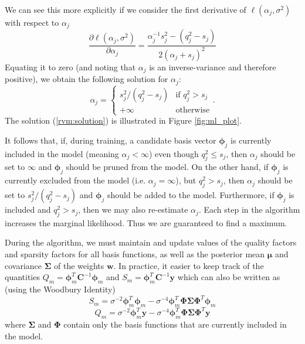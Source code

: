 We can see this more explicitly if we consider the first derivative of $\ell(\alpha_j,\sigma^2)$ with respect to $\alpha_j$ \cite{tipping2002}
\begin{equation*}
  \frac{\partial\ell(\alpha_j,\sigma^2)}{\partial\alpha_j} = \frac{\alpha_j^{-1}s_j^2 - (q_j^2 - s_j)}{2(\alpha_j+s_j)^2}
\end{equation*}
Equating it to zero (and noting that $\alpha_j$ is an inverse-variance and therefore positive), we obtain the following solution for $\alpha_j$:
\begin{equation}
  \label{rvm:solution}
  \alpha_j = \left\{\begin{array}{lr}
      s_j^2 / (q_j^2 - s_j) & \mbox{if $q_j^2 > s_j$}\\
      +\infty & \mbox{otherwise}
    \end{array}\right..
\end{equation}
The solution (\ref{rvm:solution}) is illustrated in Figure \ref{fig:ml_plot}.

It follows that, if, during training, a candidate basis vector $\bm\phi_j$ is currently included in the model (meaning $\alpha_j < \infty$) even though $q_j^2 \leq s_j$, then $\alpha_j$ should be set to $\infty$ and $\bm\phi_j$ should be pruned from the model.
On the other hand, if $\bm\phi_j$ is currently excluded from the model (i.e. $\alpha_j=\infty$), but $q_j^2 > s_j$, then $\alpha_j$ should be set to $s_j^2/(q_j^2-s_j)$ and $\bm\phi_j$ should be added to the model.
Furthermore, if $\bm\phi_j$ is included and $q_j^2 > s_j$, then we may also re-estimate $\alpha_j$.
Each step in the algorithm increases the marginal likelihood. 
Thus we are guaranteed to find a maximum.

During the algorithm, we must maintain and update values of the quality factors and sparsity factors for all basis functions, as well as the posterior mean $\bm\mu$ and covariance $\bm\Sigma$ of the weights $\bm w$.
In practice, it easier to keep track of the quantities $Q_m = \bm\phi_m^T\bm C^{-1}\bm\phi_m$ and $S_m = \bm\phi_m^T\bm C^{-1}\bm y$ which can also be written as (using the Woodbury Identity)
\begin{equation}
  \label{rvm:S}
  S_m = \sigma^{-2}\bm\phi_m^T\bm\phi_m - \sigma^{-4}\bm\phi_m^T\bm\Phi\bm\Sigma\bm\Phi^T\bm\phi_m
\end{equation}
\begin{equation}
  \label{rvm:Q}
  Q_m = \sigma^{-2}\bm\phi_m^T\bm y - \sigma^{-4}\bm\phi_m^T\bm\Phi\bm\Sigma\bm\Phi^T\bm y
\end{equation}
where $\bm\Sigma$ and $\bm\Phi$ contain only the basis functions that are currently included in the model.
                                                 
